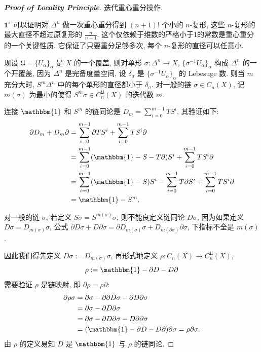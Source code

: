 \begin{proof}[{\bf Proof of Locality Principle}]
             迭代重心重分操作.

            \noindent$\mathbf{1}^\circ$ 可以证明对 $\Delta^n$ 做一次重心重分得到 $(n+1)!$ 个小的 $n$-复形, 这些 $n$-复形的最大直径不超过原复形的 $\frac{n}{n+1}$.
            这个仅依赖于维数的严格小于1的常数是重心重分的一个关键性质. 它保证了只要重分足够多次, 每个 $n$-复形的直径可以任意小.

            现设 $\mathfrak{U}=\{U_{\alpha}\}_{\alpha}$ 是 $X$ 的一个覆盖, 则对单形 $\sigma:\Delta^n\rightarrow X$, $\{\sigma^{-1}U_{\alpha}\}_{\alpha}$ 构成 $\Delta^n$ 的一个开覆盖, 
            因为 $\Delta^n$ 是完备度量空间, 设 $\delta_\sigma$ 是 $\{\sigma^{-1}U_{\alpha}\}_{\alpha}$ 的 Lebesuge 数. 则当 $m$ 充分大时, $S^m\Delta^n$ 中的每个单形的直径都小于 $\delta_\sigma$.
            对一般的链 $\sigma\in C_n(X)$, 记 $m(\sigma)$ 为最小的使得 $S^m\sigma\in C^{\mathfrak{U}}_n(X)$ 的迭代数 $m$.

            连接 $\mathbbm{1}$ 和 $S^m$ 的链同论是 $D_m=\sum\limits_{i=0}^{m-1}TS^i$, 其验证如下:
            \begin{align*}
                \partial D_m + D_m\partial &= \sum_{i=0}^{m-1}\partial TS^i + \sum_{i=0}^{m-1}TS^i\partial \\
                &= \sum_{i=0}^{m-1}(\mathbbm{1} - S - T\partial)S^i + \sum_{i=0}^{m-1}TS^i\partial \\
                &= \sum_{i=0}^{m-1}(\mathbbm{1} - S)S^i - \sum_{i=0}^{m-1}T\partial S^i + \sum_{i=0}^{m-1}TS^i\partial \\
                &= \mathbbm{1} - S^m.
            \end{align*}
           
            对一般的链 $\sigma$, 若定义 $S\sigma = S^{m(\sigma)}\sigma$, 则不能良定义链同论 $D\sigma$, 因为如果定义 $D\sigma = D_{m(\sigma)}\sigma$, 
            公式 $\partial D\sigma+D\partial\sigma = \partial D_{m(\sigma)}\sigma+D_{m(\partial\sigma)}\partial\sigma$, 下指标不全是 $m(\sigma)$. 
             
            因此我们得先定义 $D\sigma := D_{m(\sigma)}\sigma$, 再形式地定义 $\rho:C_n(X)\rightarrow C^{\mathfrak{U}}_n(X)$, 
            \begin{equation*}
                \rho := \mathbbm{1} - \partial D - D\partial
            \end{equation*}
            需要验证 $\rho$ 是链映射, 即 $\partial\rho=\rho\partial$:
            \begin{align*}
                \partial\rho\sigma &= \partial\sigma - \partial\partial D\sigma - \partial D\partial\sigma \\
                &= \partial\sigma - \partial D\partial\sigma \\
                &= \partial\sigma - \partial D\partial\sigma - D\partial\partial\sigma \\
                &= (\mathbbm{1} - \partial D - D\partial)\partial\sigma = \rho\partial\sigma.
            \end{align*}
            由 $\rho$ 的定义易知 $D$ 是 $\mathbbm{1}$ 与 $\rho$ 的链同论.


\end{proof}
